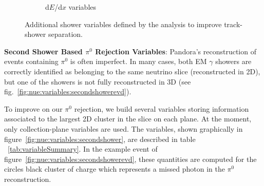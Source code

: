 \begin{figure}[H]
\begin{center}
\begin{subfigure}[b]{0.3\textwidth}
    \caption{\label{fig:nue:variables:dedx} d$E$/d$x$ variables }
    \end{subfigure}
\caption{\label{fig:nue:presel:eff} Additional shower variables defined by the analysis to improve track-shower separation.}
\end{center}
\end{figure}

\par \noindent  \textbf{Second Shower Based $\pi^0$ Rejection Variables}: %
Pandora's reconstruction of events containing $\pi^0$ is often imperfect. In many cases, both EM $\gamma$ showers are correctly identified as belonging to the same neutrino slice (reconstructed in 2D), but one of the showers is not fully reconstructed in 3D (see fig.~\ref{fig:nue:variables:secondshowerevd}).

To improve on our $\pi^0$ rejection, we build several variables storing information associated to the largest 2D cluster in the slice on each plane. At the moment, only collection-plane variables are used. The variables, shown graphically in figure~\ref{fig:nue:variables:secondshower}, are described in table ~\ref{tab:variableSummary}. In the example event of figure~\ref{fig:nue:variables:secondshowerevd}, these quantities are computed for the circles black cluster of charge which represents a missed photon in the $\pi^0$ reconstruction.

